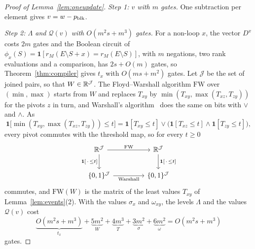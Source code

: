 \begin{proof}[Proof of Lemma~\ref{lem:oneupdate}]
\emph{Step 1: $v$ with $m$ gates.}  One subtraction per element gives $v=w-p_{\operatorname{blk}}$.

\emph{Step 2: $\Lambda$ and $\mathcal Q(v)$ with $O(m^{2}s+m^{3})$ gates.}  For a non-loop $x$, the vector $D^{x}$ costs $2m$
gates and the Boolean circuit of $\phi_x(S)=\mathbf 1[r_M(E\setminus S+x)=r_M(E\setminus S)]$,
with $m$ negations, two rank evaluations and a comparison, has $2s+O(m)$ gates, so
Theorem~\ref{thm:compiler} gives $t_x$ with $O(ms+m^{2})$ gates.  Let $\mathcal J$ be the
set of joined pairs, so that $W\in\mathbb R^{\mathcal J}$.  The Floyd--Warshall algorithm
$\mathrm{FW}$ over $(\min,\max)$ starts from $W$ and replaces $T_{xy}$ by
$\min(T_{xy},\max(T_{xz},T_{zy}))$ for the pivots $z$ in turn, and Warshall's
algorithm~\cite{warshall62} does the same on bits with $\vee$ and $\wedge$.  As
\[
  \mathbf 1\bigl[\min(T_{xy},\max(T_{xz},T_{zy}))\le t\bigr]
  =\mathbf 1[T_{xy}\le t]\vee\bigl(\mathbf 1[T_{xz}\le t]\wedge\mathbf 1[T_{zy}\le t]\bigr),
\]
every pivot commutes with the threshold map, so for every $t\ge0$
\[
  \begin{tikzcd}[column sep=4.5em,row sep=2.2em]
    \R^{\mathcal J}\arrow[r,"\mathrm{FW}"]\arrow[d,"{\mathbf 1[\,\cdot\,\le t]}"'] &
    \R^{\mathcal J}\arrow[d,"{\mathbf 1[\,\cdot\,\le t]}"]\\
    \{0,1\}^{\mathcal J}\arrow[r,"\text{Warshall}"'] & \{0,1\}^{\mathcal J}
  \end{tikzcd}
\]
commutes, and $\mathrm{FW}(W)$ is the matrix of the least values $T_{xy}$ of
Lemma~\ref{lem:events}(2).  With the
values $\sigma_x$ and $\omega_{xy}$, the levels $\Lambda$ and the values
$\mathcal Q(v)$ cost
\[
  \underbrace{O(m^{2}s+m^{3})}_{t_x}+\underbrace{5m^{2}}_{W}+\underbrace{4m^{3}}_{T}
  +\underbrace{3m^{2}}_{\sigma}+\underbrace{6m^{2}}_{\omega}=O(m^{2}s+m^{3})
\]
gates.


\end{proof}
